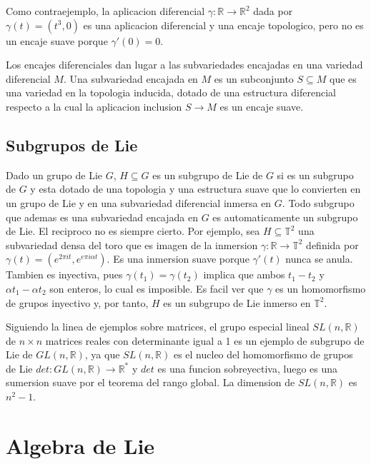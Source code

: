 \documentclass[12pt]{extarticle}
\newcommand{\R}{\mathbb{R}}
\newcommand{\T}{\mathbb{T}}
\newcommand{\<}{\langle}
\renewcommand{\>}{\rangle}
\theoremstyle{definition}
\begin{document}
Como contraejemplo, la aplicacion diferencial $\gamma : \R \rightarrow \R^2$ dada por
$\gamma(t) = (t^3, 0)$ es una aplicacion diferencial y una encaje topologico,
pero no es un encaje suave porque $\gamma'(0)=0$.

Los encajes diferenciales dan lugar a las subvariedades encajadas en una
variedad diferencial $M$. Una subvariedad encajada en $M$ es un subconjunto $S
\subseteq M$ que es una variedad en la topologia inducida, dotado de una
estructura diferencial respecto a la cual la aplicacion inclusion $S \rightarrow
M$ es un encaje suave.

\subsection{Subgrupos de Lie}

Dado un grupo de Lie $G$, $H \subseteq G$ es un subgrupo de Lie de
$G$ si es un subgrupo de $G$ y esta dotado de una topologia y una estructura
suave que lo convierten en un grupo de Lie y en una subvariedad diferencial
inmersa en $G$. Todo subgrupo que ademas es una subvariedad encajada
en $G$ es automaticamente un subgrupo de Lie. El reciproco no es siempre cierto.
Por ejemplo, sea $H \subseteq \T^2$ una subvariedad densa del toro que es imagen
de la inmersion $\gamma : \R \rightarrow \T^2$ definida por $\gamma(t)=(e^{2 \pi
it}, e^{e \pi i \alpha t})$. Es una inmersion suave porque $\gamma'(t)$ nunca se
anula. Tambien es inyectiva, pues $\gamma(t_1) = \gamma(t_2)$ implica que ambos
$t_1 - t_2$ y $\alpha t_1 - \alpha t_2$ son enteros, lo cual es imposible. Es
facil ver que $\gamma$ es un homomorfismo de grupos inyectivo y, por tanto, $H$
es un subgrupo de Lie inmerso en $\T^2$.

Siguiendo la linea de ejemplos sobre matrices, el grupo especial lineal $SL(n,
\R)$ de $n \times n$ matrices reales con determinante igual a 1 es un ejemplo de
subgrupo de Lie de $GL(n, \R)$, ya que $SL(n, \R)$ es el
nucleo del homomorfismo de grupos de Lie $det: GL(n, \R) \rightarrow \R^*$ y
$det$ es una funcion sobreyectiva, luego es una sumersion suave por el teorema
del rango global. La dimension de $SL(n, \R)$ es $n^2 - 1$.

\section{Algebra de Lie}
\end{document}
